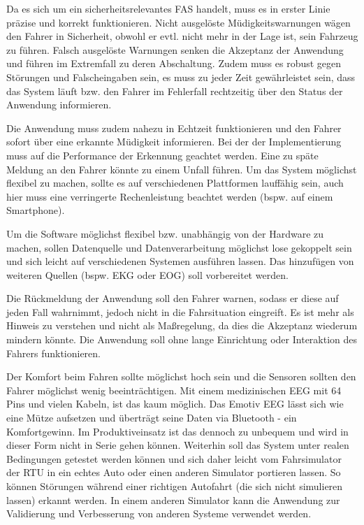 \label{chap:requirements}
Da es sich um ein sicherheitsrelevantes \acl{FAS} handelt, muss es in erster Linie präzise und korrekt funktionieren. Nicht ausgelöste Müdigkeitswarnungen wägen den Fahrer in Sicherheit, obwohl er evtl. nicht mehr in der Lage ist, sein Fahrzeug zu führen. Falsch ausgelöste Warnungen senken die Akzeptanz der Anwendung und führen im Extremfall zu deren   Abschaltung. Zudem muss es robust gegen Störungen und Falscheingaben sein, es muss zu jeder Zeit gewährleistet sein, dass das System läuft bzw. den Fahrer im Fehlerfall rechtzeitig über den Status der Anwendung informieren.

Die Anwendung muss zudem nahezu in Echtzeit funktionieren und den Fahrer sofort über eine erkannte Müdigkeit informieren. Bei der der Implementierung muss auf die Performance der Erkennung geachtet werden. Eine zu späte Meldung an den Fahrer könnte zu einem Unfall führen. Um das System möglichst flexibel zu machen, sollte es auf verschiedenen Plattformen lauffähig sein, auch hier muss eine verringerte Rechenleistung beachtet werden (bspw. auf einem Smartphone).

Um die Software möglichst flexibel bzw. unabhängig von der Hardware zu machen, sollen Datenquelle und Datenverarbeitung möglichst lose gekoppelt sein und sich leicht auf verschiedenen Systemen ausführen lassen. Das hinzufügen von weiteren Quellen (bspw. EKG oder EOG) soll vorbereitet werden.

Die Rückmeldung der Anwendung soll den Fahrer warnen, sodass er diese auf jeden Fall wahrnimmt, jedoch nicht in die Fahrsituation eingreift. Es ist mehr als Hinweis zu verstehen und nicht als Maßregelung, da dies die Akzeptanz wiederum mindern könnte. Die Anwendung soll ohne lange Einrichtung oder Interaktion des Fahrers funktionieren.

Der Komfort beim Fahren sollte möglichst hoch sein und die Sensoren sollten den Fahrer möglichst wenig beeinträchtigen. Mit einem medizinischen EEG mit 64 Pins und vielen Kabeln, ist das kaum möglich. Das Emotiv EEG lässt sich wie eine Mütze aufsetzen und überträgt seine Daten via Bluetooth - ein Komfortgewinn. Im Produktiveinsatz ist das dennoch zu unbequem und wird in dieser Form nicht in Serie gehen können.
Weiterhin soll das System unter realen Bedingungen getestet werden können und sich daher leicht vom Fahrsimulator der \acl{RTU} in ein echtes Auto oder einen anderen Simulator portieren lassen. So können Störungen während einer richtigen Autofahrt (die sich nicht simulieren lassen) erkannt werden. In einem anderen Simulator kann die Anwendung zur Validierung und Verbesserung von anderen Systeme verwendet werden.

